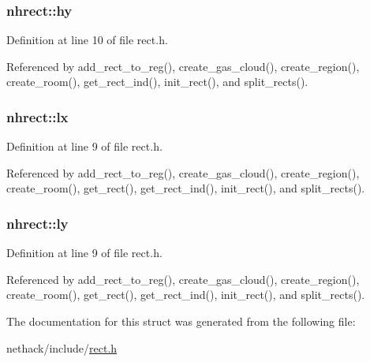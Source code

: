 \hypertarget{structnhrect_a9b42981eb9df1a1b9e37a79e07b1de5e}{
\subsubsection[{hy}]{ nhrect\+::hy}}\label{structnhrect_a9b42981eb9df1a1b9e37a79e07b1de5e}


Definition at line 10 of file rect.\+h.



Referenced by add\+\_\+rect\+\_\+to\+\_\+reg(), create\+\_\+gas\+\_\+cloud(), create\+\_\+region(), create\+\_\+room(), get\+\_\+rect\+\_\+ind(), init\+\_\+rect(), and split\+\_\+rects().

\hypertarget{structnhrect_acfb56c33a9fd34960bb7b86f8470cdcf}{
\subsubsection[{lx}]{ nhrect\+::lx}}\label{structnhrect_acfb56c33a9fd34960bb7b86f8470cdcf}


Definition at line 9 of file rect.\+h.



Referenced by add\+\_\+rect\+\_\+to\+\_\+reg(), create\+\_\+gas\+\_\+cloud(), create\+\_\+region(), create\+\_\+room(), get\+\_\+rect(), get\+\_\+rect\+\_\+ind(), init\+\_\+rect(), and split\+\_\+rects().

\hypertarget{structnhrect_ab036ec40a3e9eea9628acfd47c94a181}{
\subsubsection[{ly}]{ nhrect\+::ly}}\label{structnhrect_ab036ec40a3e9eea9628acfd47c94a181}


Definition at line 9 of file rect.\+h.



Referenced by add\+\_\+rect\+\_\+to\+\_\+reg(), create\+\_\+gas\+\_\+cloud(), create\+\_\+region(), create\+\_\+room(), get\+\_\+rect(), get\+\_\+rect\+\_\+ind(), init\+\_\+rect(), and split\+\_\+rects().



The documentation for this struct was generated from the following file\+:\begin{DoxyCompactItemize}
\item 
nethack/include/\hyperlink{rect_8h}{rect.\+h}\end{DoxyCompactItemize}
